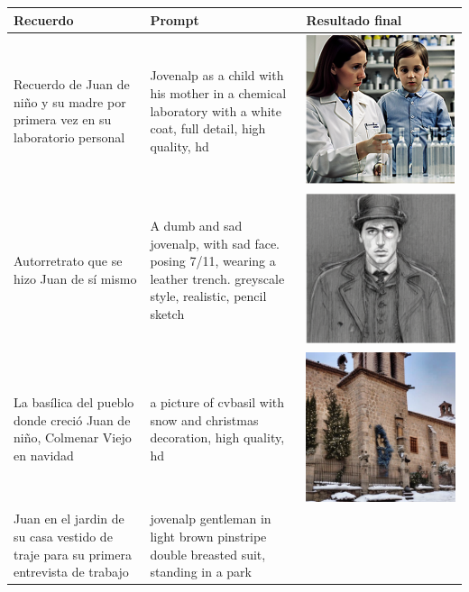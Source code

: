  \begin{table}
 	\centering
 	\begin{tabular}{>{\centering\arraybackslash}m{5cm} >{\arraybackslash}m{5cm}>{\arraybackslash}m{5cm}}
 		\textbf{Recuerdo} & \textbf{Prompt} & \textbf{Resultado final} \\
 		\hline
 		Recuerdo de Juan de niño y su madre por primera vez en su laboratorio personal & Jovenalp as a child with his mother in a chemical laboratory with a white coat, full detail, high quality, hd & \includegraphics[width = 0.3
 		\textwidth]{Imagenes/Vectorial/alpysumadrelab.png}\\
 		\hline
 		Autorretrato que se hizo Juan de sí mismo &A dumb and sad jovenalp, with sad face. posing 7/11, wearing a leather trench. greyscale style, realistic, pencil sketch & \includegraphics[width = 0.3
 		\textwidth]{Imagenes/Vectorial/autoretratoalp.png}\\
 		\hline
 		La basílica del pueblo donde creció Juan de niño, Colmenar Viejo en navidad & a picture of cvbasil with snow and christmas decoration, high quality, hd & \includegraphics[width = 0.3
 		\textwidth]{Imagenes/Vectorial/colmewinter.png}\\
 		\hline
 		Juan en el jardin de su casa vestido de traje para su primera entrevista de trabajo & jovenalp gentleman in light brown pinstripe double breasted suit, standing in a park & \includegraphics[width = 0.3

\end{tabular}
\end{table}
